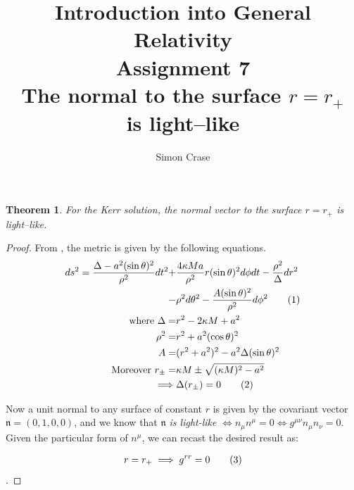 \documentclass[]{article}
\title{Introduction into General Relativity\\Assignment 7\\The normal to the surface $r=r_+$\\is light--like}
\author{Simon Crase}
\newtheorem{theorem}{Theorem}
\newcommand\numberthis{\addtocounter{equation}{1}\tag{\theequation}}
\begin{document}
\maketitle

\begin{theorem}
	For the Kerr solution, the normal vector to the surface $r=r_+$ is light--like.
\end{theorem}

\begin{proof}
	From \cite[Lecture VII,5,(174)]{akhmedev2016}, the metric is given by the following equations.
	\begin{align*}
	ds^2 = \frac{\Delta-a^2 (\sin{\theta})^2}{\rho^2}dt^2 +& \frac{4 \kappa M a}{\rho^2}r(\sin{\theta})^2 d\phi dt - \frac{\rho^2}{\Delta} dr^2\\
	-&\rho^2 d\theta^2 - \frac{A (\sin{\theta})^2}{\rho^2} d\phi^2 \numberthis \label{eq:metric}\\ 
	\text{where } \Delta =& r^2 - 2 \kappa M + a^2\\
	\rho^2 =& r^2 + a^2 (\cos{\theta})^2\\
	A =& (r^2+a^2)^2 - a^2 \Delta (\sin{\theta})^2 \\
	\text{Moreover } r_{\pm} =& \kappa M \pm \sqrt{(\kappa M)^2 - a^2} \\
	\implies& \Delta(r_{\pm})= 0\numberthis \label{eq:rpm}
	\end{align*}
	
	Now a unit normal to any surface of constant $r$ is given by the covariant vector $\mathfrak{n}=(0,1,0,0)$, and we know that $\mathfrak{n}$ \emph{is light-like} $\iff n_{\mu}n^{\mu}=0 \iff g^{\mu\nu}n_{\mu}n_{\nu}=0$. Given the particular form of $n^{\mu}$, we can recast the desired result as:
	
	\begin{align*}
	r=r_+ \implies g^{rr}=0 \numberthis \label{eq:demonstrandum}
	\end{align*}.


\end{proof}
\end{document}
